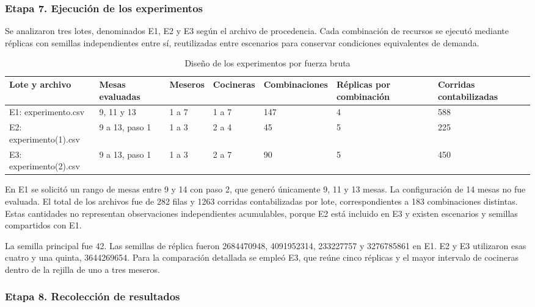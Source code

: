 \documentclass[10pt,a4paper,twocolumn]{article}
\begin{document}
\subsubsection*{Etapa 7. Ejecución de los experimentos}

Se analizaron tres lotes, denominados E1, E2 y E3 según el archivo de procedencia. Cada combinación de recursos se ejecutó mediante réplicas con semillas independientes entre sí, reutilizadas entre escenarios para conservar condiciones equivalentes de demanda.

\begin{table}[!tb]\centering\small
\caption{Diseño de los experimentos por fuerza bruta}
\label{tab:3}
\setlength{\tabcolsep}{4pt}
\renewcommand{\arraystretch}{1.18}
\begin{tabularx}{\textwidth}{YYYYYYY}
\toprule
\textbf{Lote y archivo} & \textbf{Mesas evaluadas} & \textbf{Meseros} & \textbf{Cocineras} & \textbf{Combinaciones} & \textbf{Réplicas por combinación} & \textbf{Corridas contabilizadas} \\
\midrule
E1: experimento.csv & 9, 11 y 13 & 1 a 7 & 1 a 7 & 147 & 4 & 588 \\
E2: experimento(1).csv & 9 a 13, paso 1 & 1 a 3 & 2 a 4 & 45 & 5 & 225 \\
E3: experimento(2).csv & 9 a 13, paso 1 & 1 a 3 & 2 a 7 & 90 & 5 & 450 \\
\bottomrule\end{tabularx}\end{table}

En E1 se solicitó un rango de mesas entre 9 y 14 con paso 2, que generó únicamente 9, 11 y 13 mesas. La configuración de 14 mesas no fue evaluada. El total de los archivos fue de 282 filas y 1263 corridas contabilizadas por lote, correspondientes a 183 combinaciones distintas. Estas cantidades no representan observaciones independientes acumulables, porque E2 está incluido en E3 y existen escenarios y semillas compartidos con E1.

La semilla principal fue 42. Las semillas de réplica fueron 2684470948, 4091952314, 233227757 y 3276785861 en E1. E2 y E3 utilizaron esas cuatro y una quinta, 3644269654. Para la comparación detallada se empleó E3, que reúne cinco réplicas y el mayor intervalo de cocineras dentro de la rejilla de uno a tres meseros.

\subsubsection*{Etapa 8. Recolección de resultados}
\end{document}

